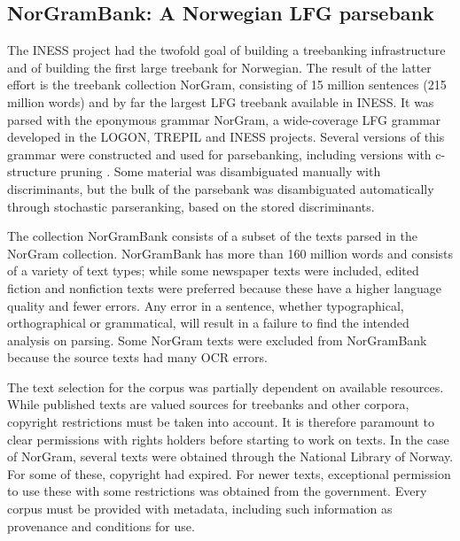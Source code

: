 \documentclass[output=paper,hidelinks]{langscibook}
\begin{document}
\subsection{NorGramBank: A Norwegian LFG parsebank}\label{norgrambank}

The INESS project had the twofold goal of building a treebanking infrastructure and of building the first large treebank for Norwegian.
The result of the latter effort is the treebank collection NorGram, consisting of 15 million sentences (215 million words) and by far the largest LFG treebank available in INESS.
It was parsed with the eponymous grammar NorGram, a wide-coverage LFG grammar developed in the LOGON, TREPIL and INESS projects.
Several versions of this grammar were constructed and used for parsebanking, including versions with c-structure pruning \citep{cahill-etal-2008-speeding}.
Some material was disambiguated manually with discriminants, but the bulk of the parsebank was disambiguated automatically through stochastic parseranking, based on the stored discriminants.

The collection NorGramBank \citep{dyvikEtAl2016} consists of a subset of the texts parsed in the NorGram collection. 
NorGramBank has more than 160 million words and consists of a variety of text types; while some newspaper texts were included, edited fiction and nonfiction texts were preferred because these have a higher language quality and fewer errors.
Any error in a sentence, whether typographical, orthographical or grammatical, will result in a failure to find the intended analysis on parsing.
Some NorGram texts were excluded from NorGramBank because the source texts had many OCR errors.

\hspace*{-2.5pt}The text selection for the corpus was partially dependent on available resources.
While published texts are valued sources for treebanks and other corpora, copyright restrictions must be taken into account.
It is therefore paramount to clear permissions with rights holders before starting to work on texts.
In the case of NorGram, several texts were obtained through the National Library of Norway.
For some of these, copyright had expired.
For newer texts, exceptional permission to use these with some restrictions was obtained from the government. %
Every corpus must be provided with metadata, including such information as provenance and conditions for use.
\end{document}
